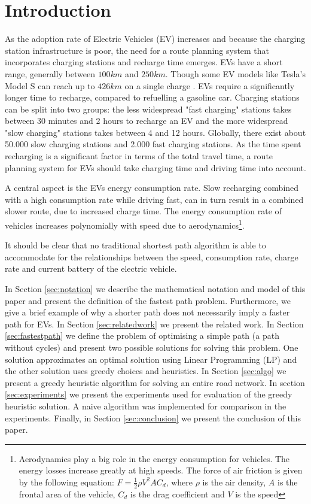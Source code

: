 \section{Introduction}

As the adoption rate of Electric Vehicles (EV) increases \cite{Henry2013} and because the charging station infrastructure is poor, the need for a route planning system that incorporates charging stations and recharge time emerges. EVs have a short range, generally between $100\si{km}$ and $250\si{km}$. Though some EV models like Tesla's Model S can reach up to $426\si{km}$ on a single charge \cite{teslacon}. EVs require a significantly longer time to recharge, compared to refuelling a gasoline car. Charging stations can be split into two groups: the less widespread "fast charging" stations takes between 30 minutes and 2 hours to recharge an EV and the more widespread "slow charging" stations takes between 4 and 12 hours. Globally, there exist about 50.000 slow charging stations and 2.000 fast charging stations\cite{Globalevoutlook}. As the time spent recharging is a significant factor in terms of the total travel time, a route planning system for EVs should take charging time and driving time into account.

A central aspect is the EVs energy consumption rate. Slow recharging combined with a high consumption rate while driving fast, can in turn result in a combined slower route, due to increased charge time. The energy consumption rate of vehicles increases polynomially with speed due to aerodynamics\footnote{Aerodynamics play a big role in the energy consumption for vehicles. The energy losses increase greatly at high speeds. The force of air friction is given by the following equation: $F = \frac{1}{2} \rho V^2 A C_d$, where $\rho$ is the air density, $A$ is the frontal area of the vehicle, $C_d$ is the drag coefficient and $V$ is the speed}.

It should be clear that no traditional shortest path algorithm is able to accommodate for the relationships between the speed, consumption rate, charge rate and current battery of the electric vehicle. 

In Section \ref{sec:notation} we describe the mathematical notation and model of this paper and present the definition of the fastest path problem. Furthermore, we give a brief example of why a shorter path does not necessarily imply a faster path for EVs. In Section \ref{sec:relatedwork} we present the related work. In Section \ref{sec:fastestpath} we define the problem of optimising a simple path (a path without cycles) and present two possible solutions for solving this problem. One solution approximates an optimal solution using Linear Programming (LP) and the other solution uses greedy choices and heuristics. In Section \ref{sec:algo} we present a greedy heuristic algorithm for solving an entire road network. In section \ref{sec:experiments} we present the experiments used for evaluation of the greedy heuristic solution. A naive algorithm was implemented for comparison in the experiments. Finally, in Section \ref{sec:conclusion} we present the conclusion of this paper.    

